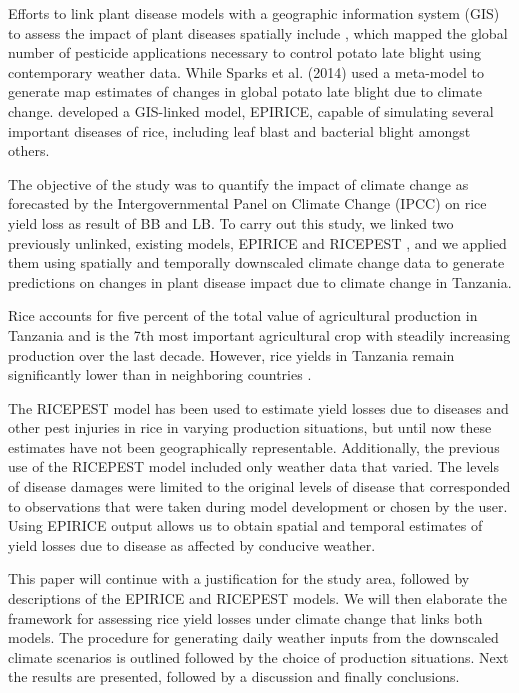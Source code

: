 \documentclass[preprint,12pt]{elsarticle}
\begin{document}
Efforts to link plant disease models with a geographic information system (GIS) to assess the impact of plant diseases spatially include  \citet{Hijmans2000}, which mapped the global number of pesticide applications necessary to control potato late blight using contemporary weather data. While Sparks et al. (2014) used a meta-model to generate map estimates of changes in global potato late blight due to climate change. \citet{Savary2012} developed a GIS-linked model, EPIRICE, capable of simulating several important diseases of rice, including leaf blast and bacterial blight amongst others.

The objective of the study was to quantify the impact of climate change as forecasted by the Intergovernmental Panel on Climate Change (IPCC) on rice yield loss as result of BB and LB. To carry out this study, we linked two previously unlinked, existing models, EPIRICE and RICEPEST \cite{Willocquet2000, Willocquet2002}, and we applied them using spatially and temporally downscaled climate change data to generate predictions on changes in plant disease impact due to climate change in Tanzania.

Rice accounts for five percent of the total value of agricultural production in Tanzania and is the 7th most important agricultural crop with steadily increasing production over the last decade. However, rice yields in Tanzania remain significantly lower than in neighboring countries \cite{Barreiro-Hurle2012}.

The RICEPEST model has been used to estimate yield losses due to diseases and other pest injuries in rice in varying production situations, but until now these estimates have not been geographically representable. Additionally, the previous use of the RICEPEST model included only weather data that varied. The levels of disease damages were limited to the original levels of disease that corresponded to observations that were taken during model development or chosen by the user. Using EPIRICE output allows us to obtain spatial and temporal estimates of yield losses due to disease as affected by conducive weather.

This paper will continue with a justification for the study area, followed by descriptions of the EPIRICE and RICEPEST models. We will then elaborate the framework for assessing rice yield losses under climate change that links both models. The procedure for generating daily weather inputs from the downscaled climate scenarios is outlined followed by the choice of production situations. Next the results are presented, followed by a discussion and finally conclusions.
\end{document}
